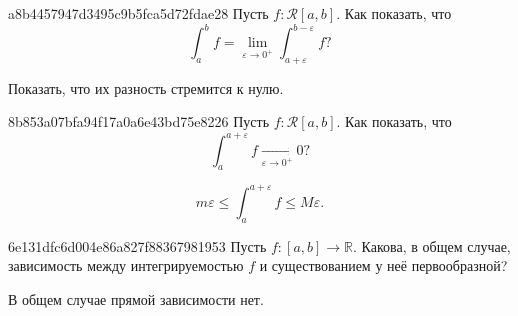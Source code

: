 \begin{note}{a8b4457947d3495c9b5fca5d72fdae28}
    Пусть \({ f : \mathcal R[a, b] }\). Как показать, что
    \[
        \int_{a}^{b} f = \lim_{\varepsilon \to 0^{+}} \int_{a + \varepsilon}^{b - \varepsilon} f?
    \]

    \begin{cloze}{1}
        Показать, что их разность стремится к нулю.
    \end{cloze}
\end{note}

\begin{note}{8b853a07bfa94f17a0a6e43bd75e8226}
    Пусть \({ f : \mathcal R[a, b] }\). Как показать, что
    \[
        \int_{a}^{a + \varepsilon} f \underset{\varepsilon \to 0^{+}}\longrightarrow 0?
    \]

    \begin{cloze}{1}
        \[
            m\varepsilon \leqslant \int_{a}^{a + \varepsilon} f \leqslant M\varepsilon.
        \]
    \end{cloze}
\end{note}

\begin{note}{6e131dfc6d004e86a827f88367981953}
    Пусть \({ f : [a, b] \to \mathbb R }\).
    Какова, в общем случае, зависимость между интегрируемостью \({ f }\) и существованием у неё первообразной?

    \begin{cloze}{1}
        В общем случае прямой зависимости нет.
    \end{cloze}
\end{note}


